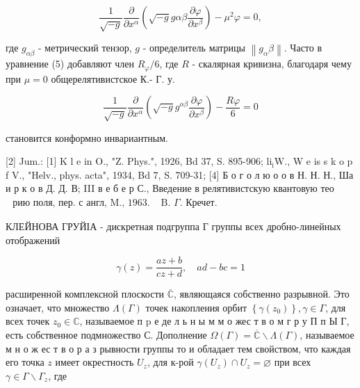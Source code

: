 \documentclass[10pt]{article}
\begin{document}
\[

\frac{1}{\sqrt{-g}} \frac{\partial}{\partial x^{\alpha}}\left(\sqrt{-g} g \alpha \beta \frac{\partial \varphi}{\partial x^{\beta}}\right)-\mu^{2} \varphi=0,

\]



где $g_{\alpha \beta}$ - метрический тензор, $g$ - определитель матрицы $\left\|g_{\alpha} \beta\right\|$. Часто в уравнение (5) добавляют член $R_{\varphi} / 6$, где $R$ - скалярная кривизна, благодаря чему при $\mu=0$ общерелятивистское К.- Г. у.



\[

\frac{1}{\sqrt{-g}} \frac{\partial}{\partial x^{\alpha}}\left(\sqrt{-g} g^{\alpha \beta} \frac{\partial \varphi}{\partial x^{\beta}}\right)-\frac{R \varphi}{6}=0

\]



становится конформно инвариантным.



[2] Jum.: [1] K l e in O., "Z. Phys.", 1926, Bd 37, S. 895-906; $\mathrm{li}_{\mathrm{i}} \mathrm{W}$., W e is s k o p f V., "Helv., phys. acta", 1934, Bd 7, S. 709-31; [4] Б о г о л ю о о в Н. Н. Н., Ша и р к о в Д. Д. В; III в е б е р С., Введение в релятивистскую квантовую тео$\begin{array}{ll}\text { рию поля, пер. с англ, M., } 1963 . & \text { B. } \Gamma \text {. Кречет. }\end{array}$



КЛЕЙНОВА ГРУЙІА - дискретная подгруппа Г группы всех дробно-линейных отображений



\[

\gamma(z)=\frac{a z+b}{c z+d}, \quad a d-b c=1

\]



расширенной комплексной плоскости $\overline{\mathbb{C}}$, являющаяся собственно разрывной. Это означает, что множество $\Lambda(\Gamma)$ точек накопления орбит $\left\{\gamma\left(z_{0}\right)\right\}, \gamma \in \Gamma$, для всех точек $z_{0} \in \mathbb{C}$, называемое п $\mathrm{p}$ е де л ь н ы м м о жес т в о м г р у П п Ы $Г$, есть собственное подмножество С. Дополнение $\Omega(\Gamma)=\overline{\mathbb{C}} \backslash \Lambda(\Gamma)$, называемое м н о ж ес т в о р а з рывности группы то и обладает тем свойством, что каждая его точка $z$ имеет окрестность $U_{z}$, для к-рой $\gamma\left(U_{z}\right) \cap U_{z}=\varnothing$ при всех $\gamma \in \Gamma \backslash \Gamma_{z}$, где
\end{document}
